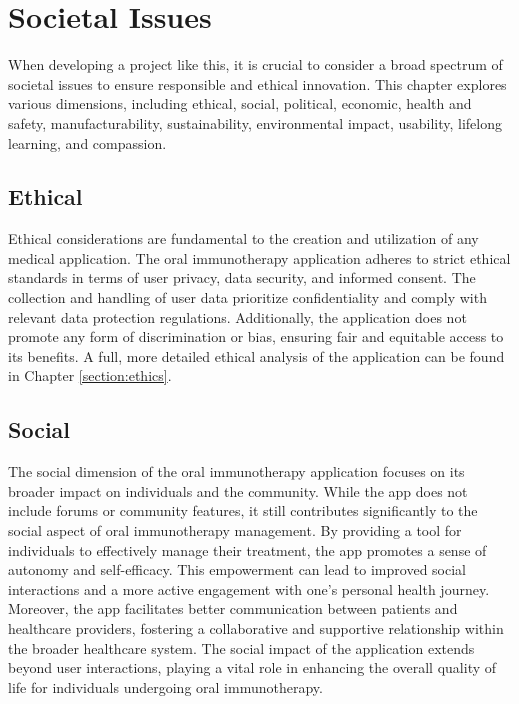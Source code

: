 \chapter{Societal Issues}

When developing a project like this, it is crucial to consider a broad spectrum of societal issues to ensure responsible and ethical innovation. This chapter explores various dimensions, including ethical, social, political, economic, health and safety, manufacturability, sustainability, environmental impact, usability, lifelong learning, and compassion.

\section{Ethical}

Ethical considerations are fundamental to the creation and utilization of any medical application. The oral immunotherapy application adheres to strict ethical standards in terms of user privacy, data security, and informed consent. The collection and handling of user data prioritize confidentiality and comply with relevant data protection regulations. Additionally, the application does not promote any form of discrimination or bias, ensuring fair and equitable access to its benefits. A full, more detailed ethical analysis of the application can be found in Chapter \ref{section:ethics}.

\section{Social}

The social dimension of the oral immunotherapy application focuses on its broader impact on individuals and the community. While the app does not include forums or community features, it still contributes significantly to the social aspect of oral immunotherapy management. By providing a tool for individuals to effectively manage their treatment, the app promotes a sense of autonomy and self-efficacy. This empowerment can lead to improved social interactions and a more active engagement with one's personal health journey. Moreover, the app facilitates better communication between patients and healthcare providers, fostering a collaborative and supportive relationship within the broader healthcare system. The social impact of the application extends beyond user interactions, playing a vital role in enhancing the overall quality of life for individuals undergoing oral immunotherapy.

